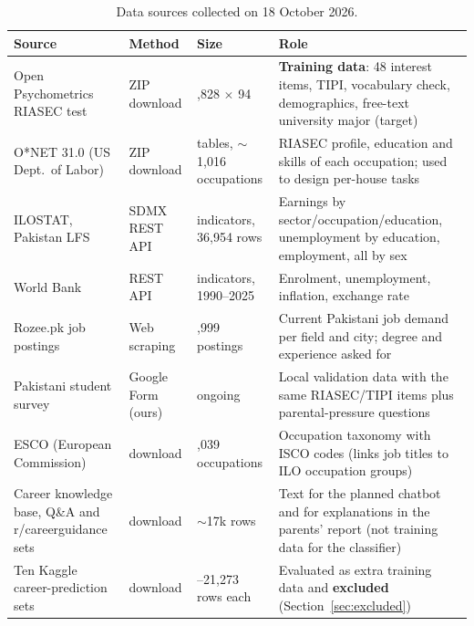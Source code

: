 \documentclass[11pt,a4paper]{article}
\begin{document}
\begin{table}[H]
\centering\small
\caption{Data sources collected on 18 October 2026.}
\label{tab:sources}
\begin{tabularx}{\linewidth}{@{}>{\raggedright\arraybackslash}p{3.3cm} >{\raggedright\arraybackslash}p{2.1cm} >{\raggedright\arraybackslash}p{2.3cm} X@{}}
\toprule
Source & Method & Size & Role \\
\midrule
Open Psychometrics RIASEC test & ZIP download & 145,828 $\times$ 94 & \textbf{Training data}: 48 interest items, TIPI, vocabulary check, demographics, free-text university major (target) \\
O*NET 31.0 (US Dept.\ of Labor) & ZIP download & 21 tables, $\sim$1,016 occupations & RIASEC profile, education and skills of each occupation; used to design per-house tasks \\
ILOSTAT, Pakistan LFS & SDMX REST API & 9 indicators, 36,954 rows & Earnings by sector/occupation/education, unemployment by education, employment, all by sex \\
World Bank & REST API & 16 indicators, 1990--2025 & Enrolment, unemployment, inflation, exchange rate \\
Rozee.pk job postings & Web scraping & 10,999 postings & Current Pakistani job demand per field and city; degree and experience asked for \\
Pakistani student survey & Google Form (ours) & ongoing & Local validation data with the same RIASEC/TIPI items plus parental-pressure questions \\
ESCO (European Commission) & download & 3,039 occupations & Occupation taxonomy with ISCO codes (links job titles to ILO occupation groups) \\
Career knowledge base, Q\&A and r/careerguidance sets & download & $\sim$17k rows & Text for the planned chatbot and for explanations in the parents' report (not training data for the classifier) \\
Ten Kaggle career-prediction sets & download & 180--21,273 rows each & Evaluated as extra training data and \textbf{excluded} (Section~\ref{sec:excluded}) \\
\bottomrule
\end{tabularx}
\end{table}
\end{document}
